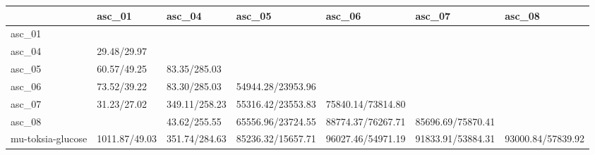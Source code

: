 \begin{tabular}{lllllll}
\toprule
{} &         asc\_01 &         asc\_04 &             asc\_05 &             asc\_06 &             asc\_07 &             asc\_08 \\
\midrule
asc\_01            &                &                &                    &                    &                    &                    \\
asc\_04            &    29.48/29.97 &                &                    &                    &                    &                    \\
asc\_05            &    60.57/49.25 &   83.35/285.03 &                    &                    &                    &                    \\
asc\_06            &    73.52/39.22 &   83.30/285.03 &  54944.28/23953.96 &                    &                    &                    \\
asc\_07            &    31.23/27.02 &  349.11/258.23 &  55316.42/23553.83 &  75840.14/73814.80 &                    &                    \\
asc\_08            &                &   43.62/255.55 &  65556.96/23724.55 &  88774.37/76267.71 &  85696.69/75870.41 &                    \\
mu-toksia-glucose &  1011.87/49.03 &  351.74/284.63 &  85236.32/15657.71 &  96027.46/54971.19 &  91833.91/53884.31 &  93000.84/57839.92 \\
\bottomrule
\end{tabular}
